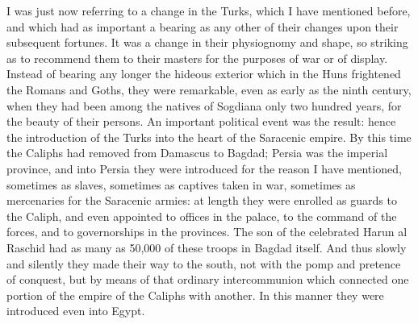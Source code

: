 I was just now referring to a
change in the Turks, which I have mentioned before, and which had as
important a bearing as any other of their changes upon their
subsequent fortunes. It was a change in their physiognomy and shape,
so striking as to recommend them to their masters for the purposes of
war or of display. Instead of bearing any longer the hideous exterior
which in the Huns frightened the Romans and Goths, they were
remarkable, even as early as the ninth century, when they had been
among the natives of Sogdiana only two hundred years, for the beauty
of their persons. An important political event was the result: hence
the introduction of the Turks into the heart of the Saracenic empire.
By this time the Caliphs had removed from Damascus to Bagdad; Persia
was the imperial province, and into Persia they were introduced for the reason I have mentioned, sometimes as slaves, sometimes as
captives taken in war, sometimes as mercenaries for the Saracenic
armies: at length they were enrolled as guards to the Caliph, and even
appointed to offices in the palace, to the command of the forces, and
to governorships in the provinces. The son of the celebrated Harun al
Raschid had as many as 50,000 of these troops in Bagdad itself. And
thus slowly and silently they made their way to the south, not with
the pomp and pretence of conquest, but by means of that ordinary
intercommunion which connected one portion of the empire of the
Caliphs with another. In this manner they were introduced even into
Egypt.

